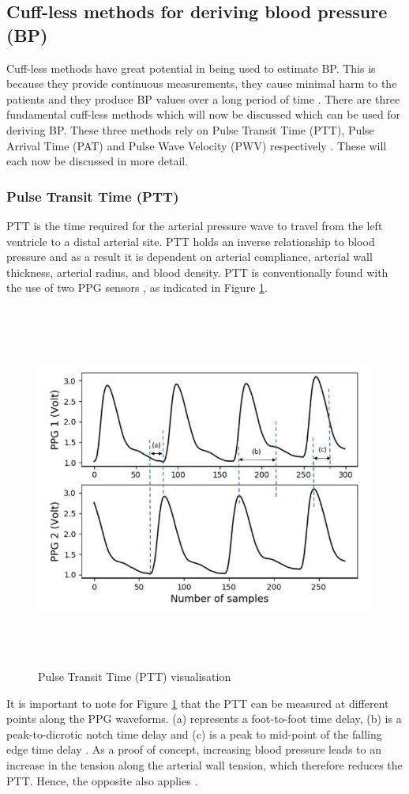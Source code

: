 \subsection{Cuff-less methods for deriving blood pressure (BP)} 
Cuff-less  methods have great potential in being used to estimate BP. 
This is because they provide continuous measurements, they cause minimal 
harm to the patients and they produce BP values over a long period of 
time  \cite{Liu2020}. There are three fundamental cuff-less methods 
which will now be discussed which can be used for deriving BP. These 
three methods rely on Pulse Transit Time (PTT), Pulse Arrival 
Time (PAT) and Pulse Wave Velocity (PWV) respectively \cite{Nye2015}. These 
will each now be discussed in more detail.

\subsubsection{Pulse Transit Time (PTT)} 
PTT is the time required for the arterial pressure wave to travel from the 
left ventricle to a distal arterial site. PTT holds an inverse relationship 
to blood pressure and as a result it is dependent on arterial compliance, 
arterial wall thickness, arterial radius, and blood density. PTT is 
conventionally found with the use of two PPG 
sensors \cite{Tanveer2018} \cite{Wang2018} \cite{ElHajj2020}, as indicated 
in Figure \ref{ptt}.
\begin{figure}[H]
    \centering
    \includegraphics[width=12cm,height=12cm,keepaspectratio]{Background/ptt.png}
    \caption{Pulse Transit Time (PTT) visualisation \cite{ElHajj2020}}
    \label{ptt}
\end{figure} \noindent It is important to note for 
Figure \ref{ptt} that the PTT can be measured at different points along 
the PPG waveforms. (a) represents a foot-to-foot time delay, (b) is a 
peak-to-dicrotic notch time delay and (c) is a peak to mid-point of the 
falling edge time delay \cite{ElHajj2020}. As a proof of concept, increasing 
blood pressure leads to an increase in the tension along the arterial wall tension, which 
therefore reduces the PTT. Hence, the opposite also applies \cite{Kumar2015}.

